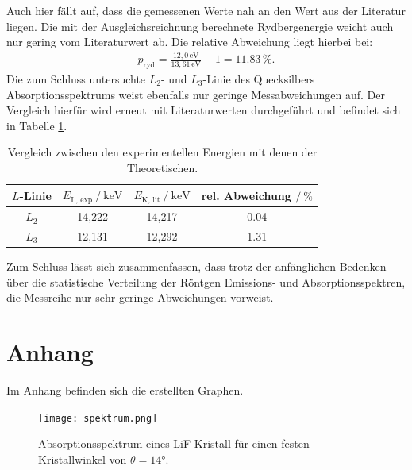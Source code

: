 \noindent Auch hier fällt auf, dass die gemessenen Werte nah an den Wert aus der Literatur liegen.
Die mit der Ausgleichsreichnung berechnete Rydbergenergie weicht auch nur gering vom Literaturwert\cite{kent} ab.
Die relative Abweichung liegt hierbei bei:
\begin{align*}
p_\text{ryd} = \frac{12,0\,\si{\electronvolt}}{13,61\,\si{\electronvolt}} -1 = \num{11,83}\,\%.
\end{align*}
Die zum Schluss untersuchte $L_2$- und $L_3$-Linie des Quecksilbers Absorptionsspektrums weist ebenfalls nur geringe Messabweichungen auf. Der Vergleich hierfür wird erneut mit Literaturwerten\cite{kent2}
durchgeführt und befindet sich in Tabelle \ref{tab:vergleich2}.
\begin{table}[H]
  \centering
  \caption{Vergleich zwischen den experimentellen Energien mit denen der Theoretischen.}
  \label{tab:vergleich2}
\begin{tabular}{c c c c}
  \toprule
$L$-Linie & $E_\text{L, exp}\:/\: \si{\kilo\electronvolt}$ & $E_\text{K, lit}\:/\: \si{\kilo\electronvolt}$ & rel. Abweichung $/\:\%$ \\
\midrule
$L_2$ & 14,222 & 14,217 & \num{0,04} \\
$L_3$ & 12,131 & 12,292 & \num{1,31} \\
\bottomrule
\end{tabular}
\end{table}
\noindent Zum Schluss lässt sich zusammenfassen, dass trotz der anfänglichen Bedenken über die statistische Verteilung der Röntgen Emissions- und Absorptionsspektren, die Messreihe nur sehr geringe
Abweichungen vorweist.

\section{Anhang}
Im Anhang befinden sich die erstellten Graphen.

\begin{figure}[H]
  \centering
  \texttt{[image: spektrum.png]}
  \caption{Absorptionsspektrum eines LiF-Kristall für einen festen Kristallwinkel von $\theta = 14$°.}
  \label{fig:plot}
\end{figure}

